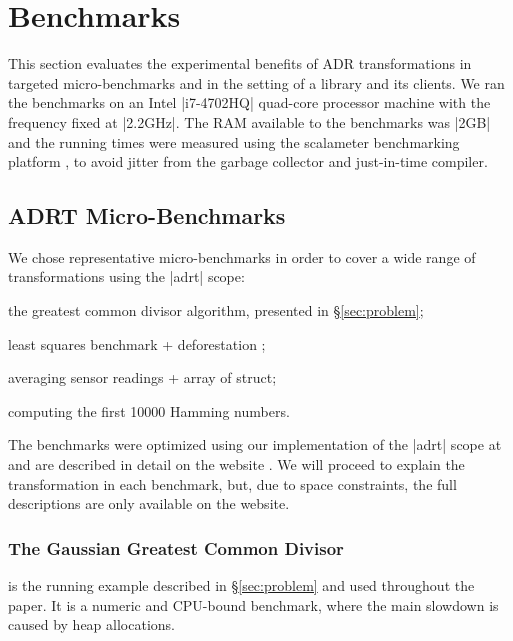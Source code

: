 \section{Benchmarks}
\label{sec:benchmarks}
\label{sec:benchmarks:ad-hoc}

This section evaluates the experimental benefits of ADR transformations in targeted micro-benchmarks and in
the setting of a library and its clients.
%
%
We ran the benchmarks on an Intel |i7-4702HQ| quad-core processor machine with the frequency fixed at |2.2GHz|. The RAM available to the benchmarks was |2GB| and the running times were measured using the scalameter benchmarking platform \cite{scalameter}, to avoid jitter from the garbage collector and just-in-time compiler.


\subsection{ADRT Micro-Benchmarks}

We chose representative micro-benchmarks in order to cover a wide range of transformations using the |adrt| scope:

\begin{compactitem}
\item the greatest common divisor algorithm, presented in \S\ref{sec:problem};
\item least squares benchmark + deforestation \cite{wadler-deforestation};
\item averaging sensor readings + array of struct;
\item computing the first 10000 Hamming numbers.
\end{compactitem}

\noindent
The benchmarks were optimized using our implementation of the |adrt| scope at \cite{ildl-plugin} and are described in detail on the website \cite{ildl-plugin-wiki}. We will proceed to explain the transformation in each benchmark, but, due to space constraints, the full descriptions are only available on the website.

\subsubsection{The Gaussian Greatest Common Divisor}
is the running example described in \S\ref{sec:problem} and used throughout the paper. It is a numeric and CPU-bound benchmark, where the main slowdown is caused by heap allocations.

